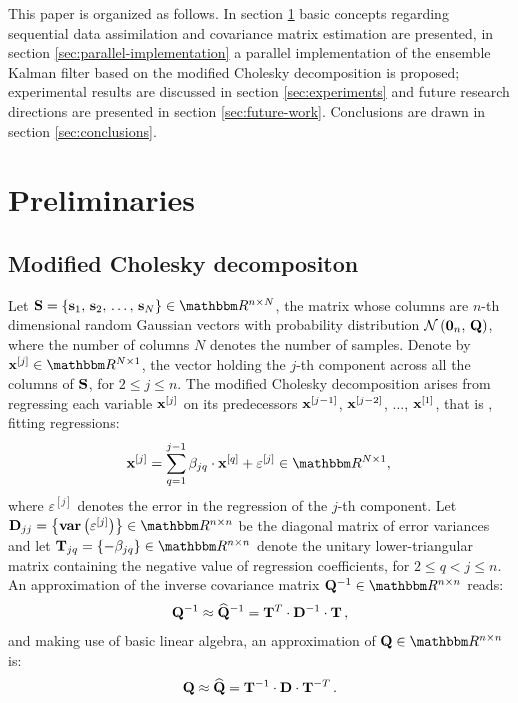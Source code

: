 \documentclass[12pt]{article}
\newcommand{\T}{{\bf T}}
\newcommand{\QEST}{{\bf \widehat{\bf Q}}}
\newcommand{\s}{{\bf s}}
\newcommand{\Nens}{N} \newcommand{\Nobs}{m} \newcommand{\Nstate}{n} \newcommand{\X}{{\bf X}} \newcommand{\x}{{\bf x}} \newcommand{\J}{\mathcal{J}} \newcommand{\lp}{\left (} \newcommand{\rp}{\right )} \newcommand{\lb}{\left [} \newcommand{\rb}{\right ]} \renewcommand{\ln}{\left \|} \newcommand{\rn}{\right \|}
\newcommand{\Q}{{\bf Q}} \renewcommand{\d}{{\bf d}} \newcommand{\Ball}{\mathcal{B}} \newcommand{\radius}{\Delta} \newcommand{\f}{{\bf f}} \newcommand{\m}{\mathcal{Q}} \newcommand{\bm}{{\bf d^B}} \newcommand{\sa}{{\bf s_{\W}}}
\renewcommand{\S}{{\bf S}} \newcommand{\errobs}{{\boldsymbol \epsilon}} \newcommand{\errbac}{{\boldsymbol \xi}} \newcommand{\K}{{\bf K}} \newcommand{\Prob}{{\mathcal{P}}} \newcommand{\bases}{{\boldsymbol \Phi}}
\newcommand{\D}{{\bf D}}
\newcommand{\zero}{{\bf 0}}
\begin{document}
This paper is organized as follows. In section \ref{sec:preliminaries} basic concepts regarding sequential data assimilation and covariance matrix estimation are presented, in section \ref{sec:parallel-implementation}  a parallel implementation of the ensemble Kalman filter based on the modified Cholesky decomposition is proposed; experimental results are discussed in section \ref{sec:experiments} and future research directions are presented in section \ref{sec:future-work}. Conclusions are drawn in section \ref{sec:conclusions}.



\section{Preliminaries}
\label{sec:preliminaries}
\subsection{Modified Cholesky decompositon}
\label{subsec:modified-cholesky}

Let $\S = \lle \s_1,\, \s_2,\,\ldots,\,\s_{\Nens} \rle 
\in \Re^{\Nstate \times \Nens}$, the matrix whose columns are $\Nstate$-th dimensional random Gaussian vectors with probability distribution $\Nor \lp \zero_{\Nstate},\, \Q \rp$, where the number of columns $\Nens$ denotes the number of samples. Denote by $\x^{[j]} \in \Re^{\Nens \times 1}$, the vector holding the $j$-th component across all the columns of $\S$, for $2 \le j \le \Nstate$. The modified Cholesky decomposition \cite{modifiedCholesky} arises from regressing each variable $\x^{[j]}$ on its predecessors $\x^{[j-1]}$, $\x^{[j-2]}$, $\ldots$, $\x^{[1]}$, that is , fitting regressions:
\begin{eqnarray}
\label{eq:modified-Cholesky-decomposition}
\displaystyle
\x^{[j]} = \sum_{q=1}^{j-1} \beta_{jq} \cdot \x^{[q]} + \varepsilon^{[j]} \in \Re^{\Nens \times 1} ,\,
\end{eqnarray}
where $\varepsilon^{[j]}$ denotes the error in the regression of the $j$-th component. Let $\D_{jj} = \lle {\bf var} \lp \varepsilon^{[j]} \rp \rle \in \Re^{\Nstate \times \Nstate}$ be the diagonal matrix of error variances and let $\T_{jq} = \{-\beta_{jq}\} \in \Re^{\Nstate \times \Nstate}$ denote the unitary lower-triangular matrix containing the negative value of  regression coefficients, for $2 \le q < j \le \Nstate$.
 An approximation of the inverse covariance matrix $\Q^{-1} \in \Re^{\Nstate \times \Nstate}$ reads:
\begin{eqnarray}
\label{eq:approximated-Q-inverse}
\Q^{-1} \approx \QEST^{-1} = \T^T \cdot \D^{-1} \cdot \T  \,,
\end{eqnarray}
and making use of basic linear algebra, an approximation of $\Q \in \Re^{\Nstate \times \Nstate}$ is:
\begin{eqnarray}
\label{eq:approximated-Q}
\Q \approx \QEST = \T^{-1} \cdot \D \cdot \T^{-T}  \,.
\end{eqnarray}
\end{document}

